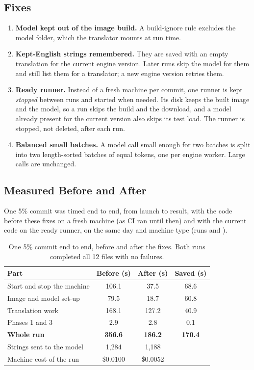 \subsection{Fixes}
\begin{enumerate}
  \item \textbf{Model kept out of the image build.} A build-ignore rule excludes the model folder, which the translator
        mounts at run time.
  \item \textbf{Kept-English strings remembered.} They are saved with an empty translation for the current engine version.
        Later runs skip the model for them and still list them for a translator; a new engine version retries them.
  \item \textbf{Ready runner.} Instead of a fresh machine per commit, one runner is kept \emph{stopped} between runs and
        started when needed. Its disk keeps the built image and the model, so a run skips the build and the download, and a
        model already present for the current version also skips its test load. The runner is stopped, not deleted, after
        each run.
  \item \textbf{Balanced small batches.} A model call small enough for two batches is split into two length-sorted batches
        of equal tokens, one per engine worker. Large calls are unchanged.
\end{enumerate}

\subsection{Measured Before and After}
One 5\% commit was timed end to end, from launch to result, with the code before these fixes on a fresh machine (as CI ran
until then) and with the current code on the ready runner, on the same day and machine type
(runs  and ).

\begin{table}[H]
\centering
\caption[One 5\% commit before and after the fixes]{One 5\% commit end to end, before and after the fixes. Both runs completed all 12 files with no failures.}
\label{tab:beforeafter}
\begin{tabular}{@{}l S[table-format=3.1] S[table-format=3.1] S[table-format=2.1]@{}}
\toprule
\textbf{Part} & {\textbf{Before (s)}} & {\textbf{After (s)}} & {\textbf{Saved (s)}} \\
\midrule
Start and stop the machine & 106.1 & 37.5 & 68.6 \\
Image and model set-up & 79.5 & 18.7 & 60.8 \\
Translation work & 168.1 & 127.2 & 40.9 \\
Phases 1 and 3 & 2.9 & 2.8 & 0.1 \\
\midrule
\textbf{Whole run} & \bfseries 356.6 & \bfseries 186.2 & \bfseries 170.4 \\
\midrule
Strings sent to the model & {1,284} & {1,188} & \\
Machine cost of the run & {\$0.0100} & {\$0.0052} & \\
\bottomrule
\end{tabular}
\end{table}


